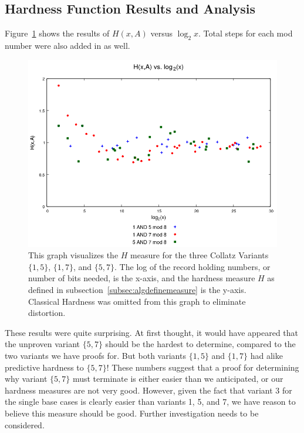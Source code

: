\subsection{Hardness Function Results and Analysis} \label{subsubsec:algmulhardness}
Figure~\ref{fig:h_multivslog} shows the results of $H(x,A)$ versus $\log_2{x}$. Total steps for each mod number were also added in as well.\par
\begin{figure}
    \centering
    \includegraphics[scale=0.75]{ModAvoidanceAnalysisPics/H_vs_log_multi_base.png}
    \caption{This graph visualizes the $H$ measure for the three Collatz Variants $\{1,5\}$, $\{1,7\}$, and $\{5,7\}$. The log of the record holding numbers, or number of bits needed, is the x-axis, and the hardness measure $H$ as defined in subsection~\ref{subsec:algdefinemeasure} is the y-axis. Classical Hardness was omitted from this graph to eliminate distortion.}
    \label{fig:h_multivslog}
\end{figure}
These results were quite surprising. At first thought, it would have appeared that the unproven variant $\{5, 7\}$ should be the hardest to determine, compared to the two variants we have proofs for. But both variants $\{1, 5\}$ and $\{1, 7\}$  had alike predictive hardness to $\{5, 7\}$! These numbers suggest that a proof for determining why variant $\{5, 7\}$ must terminate is either easier than we anticipated, or our hardness measures are not very good. However, given the fact that variant 3 for the single base cases is clearly easier than variants 1, 5, and 7, we have reason to believe this measure should be good. Further investigation needs to be considered.
